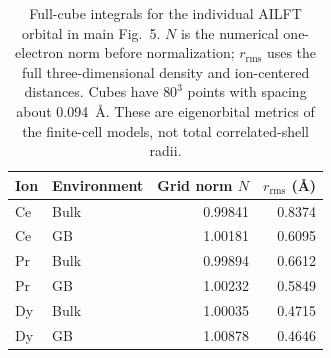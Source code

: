\begin{table}[H]
\centering
\footnotesize
\setlength{\tabcolsep}{4pt}
\caption{Full-cube integrals for the individual AILFT orbital in main Fig.~5. $N$ is the numerical one-electron norm before normalization; $r_{\mathrm{rms}}$ uses the full three-dimensional density and ion-centered distances. Cubes have $80^3$ points with spacing about 0.094~\AA. These are eigenorbital metrics of the finite-cell models, not total correlated-shell radii.}\label{tab:S10}
\begin{tabular}{llrr}
\toprule
Ion & Environment & Grid norm $N$ & $r_{\mathrm{rms}}$ (\AA) \\
\midrule
Ce & Bulk & 0.99841 & 0.8374 \\
Ce & GB & 1.00181 & 0.6095 \\
Pr & Bulk & 0.99894 & 0.6612 \\
Pr & GB & 1.00232 & 0.5849 \\
Dy & Bulk & 1.00035 & 0.4715 \\
Dy & GB & 1.00878 & 0.4646 \\
\bottomrule
\end{tabular}
\end{table}

